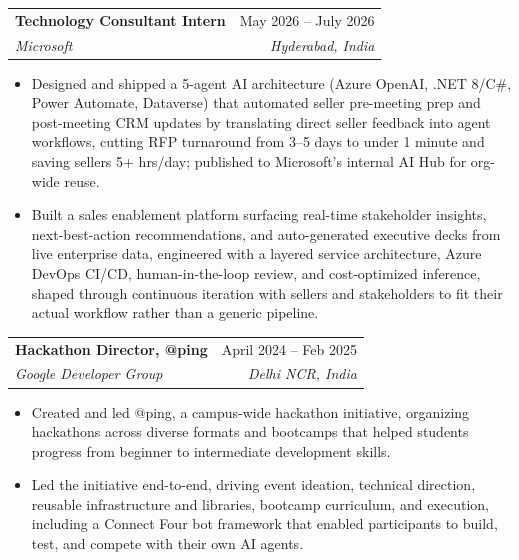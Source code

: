 \documentclass[letterpaper,8pt]{article}
\makeatletter
\newcommand{\resumeItem}[1]{
  \item\small{
    {#1 \vspace{-2pt}}
  }
}
\newcommand{\resumeSubheading}[4]{
  \vspace{-2pt}\item
    \begin{tabular*}{\textwidth}[t]{l@{\extracolsep{\fill}}r}
      \textbf{#1} & #2 \\
      \textit{\small#3} & \textit{\small #4} \\
    \end{tabular*}\vspace{-7pt}
}
\newcommand{\resumeItemListStart}{\begin{itemize}}
\newcommand{\resumeItemListEnd}{\end{itemize}\vspace{-5pt}}
\makeatother
\begin{document}
\resumeSubheading
{Technology Consultant Intern}
{May 2026 -- July 2026}
{Microsoft}{Hyderabad, India}
\resumeItemListStart
\resumeItem{Designed and shipped a 5-agent AI architecture (Azure OpenAI, .NET 8/C\#, Power Automate, Dataverse) that automated seller pre-meeting prep and post-meeting CRM updates by translating direct seller feedback into agent workflows, cutting RFP turnaround from 3--5 days to under 1 minute and saving sellers 5+ hrs/day; published to Microsoft's internal AI Hub for org-wide reuse.}
\resumeItem{Built a sales enablement platform surfacing real-time stakeholder insights, next-best-action recommendations, and auto-generated executive decks from live enterprise data, engineered with a layered service architecture, Azure DevOps CI/CD, human-in-the-loop review, and cost-optimized inference, shaped through continuous iteration with sellers and stakeholders to fit their actual workflow rather than a generic pipeline.}
\resumeItemListEnd



\resumeSubheading
{Hackathon Director, @ping}{April 2024 -- Feb 2025}
{Google Developer Group}{Delhi NCR, India}
\resumeItemListStart
\resumeItem{Created and led @ping, a campus-wide hackathon initiative, organizing hackathons across diverse formats and bootcamps that helped students progress from beginner to intermediate development skills.}
\resumeItem{Led the initiative end-to-end, driving event ideation, technical direction, reusable infrastructure and libraries, bootcamp curriculum, and execution, including a Connect Four bot framework that enabled participants to build, test, and compete with their own AI agents.}
\resumeItemListEnd
\vspace{2pt}
\end{document}
